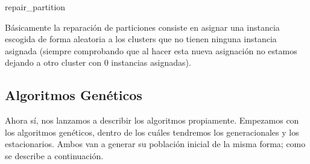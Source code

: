 \documentclass[11pt,a4paper]{article}
\begin{document}
	\begin{algorithm}[H]
	 	\caption{repair\_partition}\label{algo:repair}
	\end{algorithm} 
	Básicamente la reparación de particiones consiste en asignar una instancia escogida de forma aleatoria a los clusters que no tienen ninguna instancia asignada (siempre comprobando que al hacer esta nueva asignación no estamos dejando a otro cluster con $0$ instancias asignadas).
    
	\subsection{Algoritmos Genéticos}
	Ahora sí, nos lanzamos a describir los algoritmos propiamente. Empezamos con los algoritmos genéticos, dentro de los cuáles tendremos los generacionales y los estacionarios. Ambos van a generar su población inicial de la misma forma; como se describe a continuación.
	
\end{document}
